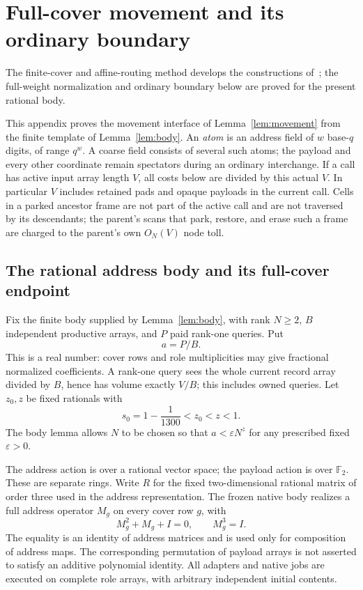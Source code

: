 \section{Full-cover movement and its ordinary boundary}
\label{app:movement}
\label{app:swap}
The finite-cover and affine-routing method develops the constructions
of~\cite{swap,mixed-precompile}; the full-weight normalization and
ordinary boundary below are proved for the present rational body.

This appendix proves the movement interface of Lemma~\ref{lem:movement}
from the finite template of Lemma~\ref{lem:body}. An \emph{atom} is an
address field of $w$ base-$q$ digits, of range $q^w$. A coarse field
consists of several such atoms; the payload and every other coordinate
remain spectators during an ordinary interchange. If a call has active input array length $V$, all costs below
are divided by this actual $V$. In particular $V$ includes retained pads
and opaque payloads in the current call. Cells in a parked ancestor frame
are not part of the active call and are not traversed by its descendants;
the parent's scans that park, restore, and erase such a frame are charged
to the parent's own $O_N(V)$ node toll.

\subsection{The rational address body and its full-cover endpoint}

Fix the finite body supplied by Lemma~\ref{lem:body}, with rank $N\ge2$,
$B$ independent productive arrays, and $P$ paid rank-one queries. Put
\[
 a=P/B.
\]
This is a real number: cover rows and role multiplicities may give
fractional normalized coefficients. A rank-one query sees the whole
current record array divided by $B$, hence has volume exactly $V/B$;
this includes owned queries. Let $z_0,z$ be fixed rationals with
\[
 s_0=1-\frac1{1300}<z_0<z<1.
\]
The body lemma allows $N$ to be chosen so that $a<\varepsilon N^z$
for any prescribed fixed $\varepsilon>0$.

The address action is over a rational vector space; the payload action is
over $\mathbb F_2$. These are separate rings. Write $R$ for the fixed
two-dimensional rational matrix of order three used in the address
representation. The frozen native body realizes a full address operator
$M_g$ on every cover row $g$, with
\begin{equation}
 M_g^2+M_g+I=0,\qquad M_g^3=I.                 \label{eq:movement-1}
\end{equation}
The equality is an identity of address matrices and is used only for
composition of address maps. The corresponding permutation of payload
arrays is not asserted to satisfy an additive polynomial identity.
All adapters and native jobs are executed on complete role arrays, with
arbitrary independent initial contents.

